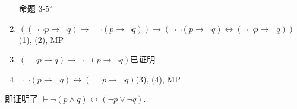 \documentclass[boxes]{homework}
\begin{document}
\begin{solution}
\begin{enumerate}[label = (\arabic*), itemsep = 0em, topsep = .5em, partopsep = .5em]
        \hfill 命题 3-$5^\circ$
        \item $((\lnot\lnot p\to\lnot q)\to \lnot\lnot (p\to \lnot q))\to (\lnot\lnot (p\to \lnot q)\leftrightarrow(\lnot\lnot p\to\lnot q))$\hfill (1), (2), MP
        \item $(\lnot\lnot p\to q)\to\lnot\lnot (p\to\lnot q)$\hfill 已证明
        \item $\lnot\lnot (p\to \lnot q)\leftrightarrow(\lnot\lnot p\to\lnot q)$\hfill (3), (4), MP
    \end{enumerate}
    即证明了 $\vdash \lnot (p\land q) \leftrightarrow (\lnot p\lor \lnot q)$.
\end{solution}
\end{document}
